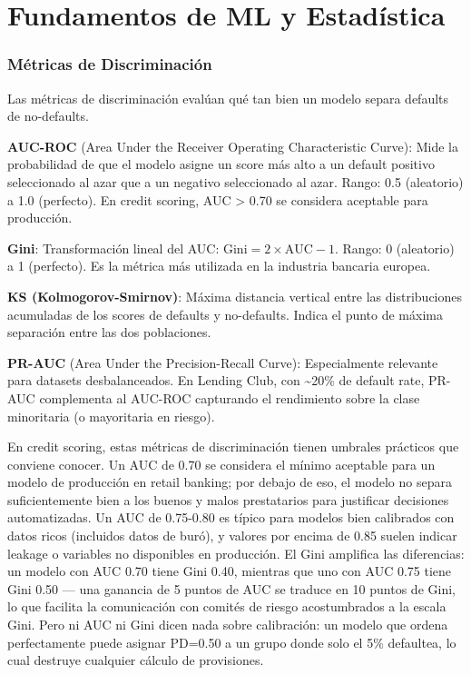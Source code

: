 \documentclass[
  spanish,
  11pt,
  letterpaper,
]{scrbook}
\theoremstyle{plain}
\theoremstyle{remark}
\begin{document}
\chapter{Fundamentos de ML y Estadística}\label{sec-ml-foundations}

\subsection{Métricas de
Discriminación}\label{muxe9tricas-de-discriminaciuxf3n}

Las métricas de discriminación evalúan qué tan bien un modelo separa
defaults de no-defaults.

\textbf{AUC-ROC} (Area Under the Receiver Operating Characteristic
Curve): Mide la probabilidad de que el modelo asigne un score más alto a
un default positivo seleccionado al azar que a un negativo seleccionado
al azar. Rango: 0.5 (aleatorio) a 1.0 (perfecto). En credit scoring, AUC
\textgreater{} 0.70 se considera aceptable para producción.

\textbf{Gini}: Transformación lineal del AUC:
\(\text{Gini} = 2 \times \text{AUC} - 1\). Rango: 0 (aleatorio) a 1
(perfecto). Es la métrica más utilizada en la industria bancaria
europea.

\textbf{KS (Kolmogorov-Smirnov)}: Máxima distancia vertical entre las
distribuciones acumuladas de los scores de defaults y no-defaults.
Indica el punto de máxima separación entre las dos poblaciones.

\textbf{PR-AUC} (Area Under the Precision-Recall Curve): Especialmente
relevante para datasets desbalanceados. En Lending Club, con
\textasciitilde20\% de default rate, PR-AUC complementa al AUC-ROC
capturando el rendimiento sobre la clase minoritaria (o mayoritaria en
riesgo).

En credit scoring, estas métricas de discriminación tienen umbrales
prácticos que conviene conocer. Un AUC de 0.70 se considera el mínimo
aceptable para un modelo de producción en retail banking; por debajo de
eso, el modelo no separa suficientemente bien a los buenos y malos
prestatarios para justificar decisiones automatizadas. Un AUC de
0.75-0.80 es típico para modelos bien calibrados con datos ricos
(incluidos datos de buró), y valores por encima de 0.85 suelen indicar
leakage o variables no disponibles en producción. El Gini amplifica las
diferencias: un modelo con AUC 0.70 tiene Gini 0.40, mientras que uno
con AUC 0.75 tiene Gini 0.50 --- una ganancia de 5 puntos de AUC se
traduce en 10 puntos de Gini, lo que facilita la comunicación con
comités de riesgo acostumbrados a la escala Gini. Pero ni AUC ni Gini
dicen nada sobre calibración: un modelo que ordena perfectamente puede
asignar PD=0.50 a un grupo donde solo el 5\% defaultea, lo cual destruye
cualquier cálculo de provisiones.
\end{document}
